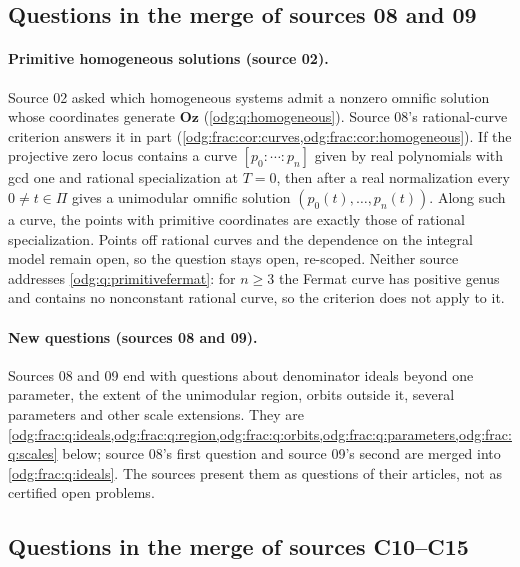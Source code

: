 \documentclass[11pt,oneside]{article}
\numberwithin{equation}{section}
\theoremstyle{definition}
\theoremstyle{remark}
\newcommand{\Oz}{\mathbf{Oz}}
\begin{document}
\subsection{Questions in the merge of sources 08 and 09}\label{odg:frac:sub:settled}

\paragraph{Primitive homogeneous solutions (source 02).} Source 02 asked which
homogeneous systems admit a nonzero omnific solution whose coordinates
generate $\Oz$ (\cref{odg:q:homogeneous}). Source 08's rational-curve criterion
answers it in part (\cref{odg:frac:cor:curves,odg:frac:cor:homogeneous}). If
the projective zero locus contains a curve $[p_0:\cdots:p_n]$ given by real
polynomials with gcd one and rational specialization at $T=0$, then after a real
normalization every $0\ne t\in\Pi$ gives a unimodular omnific solution
$(p_0(t),\ldots,p_n(t))$. Along such a curve, the points with primitive
coordinates are exactly those of rational specialization. Points off rational
curves and the dependence on the integral model remain open, so the question
stays open, re-scoped. Neither source addresses
\cref{odg:q:primitivefermat}: for $n\ge3$ the Fermat curve has positive genus
and contains no nonconstant rational curve, so the criterion does not apply to
it.

\paragraph{New questions (sources 08 and 09).} Sources 08 and 09 end with
questions about denominator ideals beyond one parameter, the extent of the
unimodular region, orbits outside it, several parameters and other scale
extensions. They are
\cref{odg:frac:q:ideals,odg:frac:q:region,odg:frac:q:orbits,odg:frac:q:parameters,odg:frac:q:scales}
below; source 08's first question and source 09's second are merged into
\cref{odg:frac:q:ideals}. The sources present them as questions of their
articles, not as certified open problems.

\subsection{Questions in the merge of sources C10--C15}\label{odg:cr:sub:settled}
\end{document}
